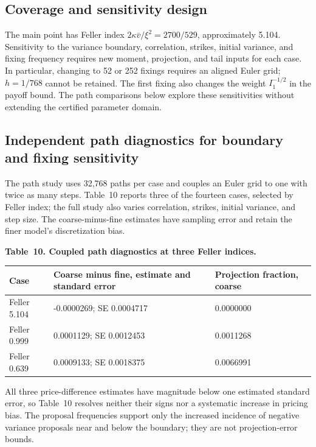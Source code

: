 \documentclass[11pt,a4paper]{article}
\begin{document}
\subsection{Coverage and sensitivity design}

The main point has Feller index
\(2\kappa\bar v/\xi^2=2700/529\), approximately 5.104. Sensitivity to the
variance boundary, correlation, strikes, initial variance, and fixing frequency
requires new moment, projection, and tail inputs for each case. In particular,
changing to 52 or 252 fixings requires an aligned Euler grid; \(h=1/768\)
cannot be retained. The first fixing also changes the weight \(I_1^{-1/2}\)
in the payoff bound. The path comparisons below explore these sensitivities
without extending the certified parameter domain.

\subsection{Independent path diagnostics for boundary and fixing sensitivity}

The path study uses 32,768 paths per case and couples an Euler grid to one
with twice as many steps. Table~10 reports three of the fourteen cases, selected
by Feller index; the full study also varies correlation, strikes, initial
variance, and step size. The coarse-minus-fine estimates have sampling error
and retain the finer model's discretization bias.

\noindent\textbf{Table~10. Coupled path diagnostics at three Feller indices.}
\begin{center}
\begin{tabularx}{\textwidth}{@{}l X X@{}}
\toprule
Case & Coarse minus fine, estimate and standard error & Projection fraction, coarse \\
\midrule
Feller 5.104 & -0.0000269; SE 0.0004717 & 0.0000000 \\
Feller 0.999 & 0.0001129; SE 0.0012453 & 0.0011268 \\
Feller 0.639 & 0.0009133; SE 0.0018375 & 0.0066991 \\
\bottomrule
\end{tabularx}
\end{center}

All three price-difference estimates have magnitude below one estimated
standard error, so Table~10 resolves neither their signs nor a systematic
increase in pricing bias. The proposal frequencies support only the increased
incidence of negative variance proposals near and below the boundary; they
are not projection-error bounds.
\end{document}
